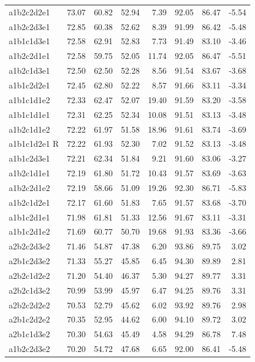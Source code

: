 \begin{table}[p]
\begin{tabular}{lrrrrrrr}
a1b2c2d2e1 & 73.07 & 60.82 & 52.94 & 7.39 & 92.05 & 86.47 & -5.54 \\
a1b2c2d3e1 & 72.85 & 60.38 & 52.62 & 8.39 & 91.99 & 86.42 & -5.48 \\
a1b1c1d3e1 & 72.58 & 62.91 & 52.83 & 7.73 & 91.49 & 83.10 & -3.46 \\
a1b2c2d1e1 & 72.58 & 59.75 & 52.05 & 11.74 & 92.05 & 86.47 & -5.51 \\
a1b2c1d3e1 & 72.50 & 62.50 & 52.28 & 8.56 & 91.54 & 83.67 & -3.68 \\
a1b1c2d2e1 & 72.45 & 62.80 & 52.22 & 8.57 & 91.66 & 83.11 & -3.34 \\
a1b1c1d1e2 & 72.33 & 62.47 & 52.07 & 19.40 & 91.59 & 83.20 & -3.58 \\
a1b1c1d1e1 & 72.31 & 62.25 & 52.34 & 10.08 & 91.51 & 83.13 & -3.48 \\
a1b2c1d1e2 & 72.22 & 61.97 & 51.58 & 18.96 & 91.61 & 83.74 & -3.69 \\
a1b1c1d2e1 R & 72.22 & 61.93 & 52.30 & 7.02 & 91.52 & 83.13 & -3.48 \\
a1b1c2d3e1 & 72.21 & 62.34 & 51.84 & 9.21 & 91.60 & 83.06 & -3.27 \\
a1b2c1d1e1 & 72.19 & 61.80 & 51.72 & 10.43 & 91.57 & 83.69 & -3.63 \\
a1b2c2d1e2 & 72.19 & 58.66 & 51.09 & 19.26 & 92.30 & 86.71 & -5.83 \\
a1b2c1d2e1 & 72.17 & 61.60 & 51.83 & 7.65 & 91.57 & 83.68 & -3.70 \\
a1b1c2d1e1 & 71.98 & 61.81 & 51.33 & 12.56 & 91.67 & 83.11 & -3.31 \\
a1b1c2d1e2 & 71.69 & 60.77 & 50.70 & 19.68 & 91.93 & 83.36 & -3.66 \\
a2b2c2d3e2 & 71.46 & 54.87 & 47.38 & 6.20 & 93.86 & 89.75 & 3.02 \\
a2b1c2d3e2 & 71.33 & 55.27 & 45.85 & 6.45 & 94.30 & 89.89 & 2.81 \\
a2b2c1d2e2 & 71.20 & 54.40 & 46.37 & 5.30 & 94.27 & 89.77 & 3.31 \\
a2b2c1d3e2 & 70.99 & 53.99 & 45.97 & 6.47 & 94.25 & 89.76 & 3.31 \\
a2b2c2d2e2 & 70.53 & 52.79 & 45.62 & 6.02 & 93.92 & 89.76 & 2.98 \\
a2b1c2d2e2 & 70.35 & 52.95 & 44.62 & 6.00 & 94.10 & 89.72 & 3.02 \\
a2b1c1d3e2 & 70.30 & 54.63 & 45.49 & 4.58 & 94.29 & 86.78 & 7.48 \\
a1b2c2d3e2 & 70.20 & 54.72 & 47.68 & 6.65 & 92.00 & 86.41 & -5.48 \\

\end{tabular}
\end{table}
